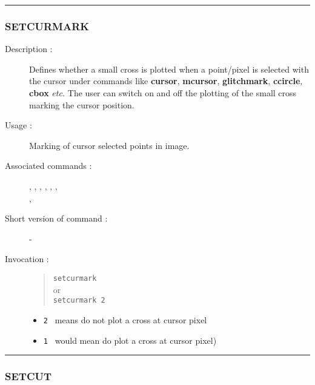 \hrule
\subsubsection*{\label{SETCURMARK}SETCURMARK}

\begin{description}

\item[Description :] Defines whether a small cross is plotted when a
point/pixel is selected with the cursor under commands like {\bf cursor},
{\bf mcursor}, {\bf glitchmark}, {\bf ccircle}, {\bf cbox} \emph{etc.}
The user can switch on and off the plotting of the small cross marking
the cursor position.

\item[Usage :] Marking of cursor selected points in image.

\item[Associated commands :] {\tt {}},
{\tt {}}, {\tt {}},
{\tt {}}, {\tt {}},
{\tt {}}, \\ {\tt {}},
{\tt {}}

\item[Short version of command :] -
\item[Invocation :]

\begin{quote}{\tt  setcurmark }\\
or \\
{\tt setcurmark 2 }
\end{quote}

\begin{itemize}

\item {\tt 2 } means do not plot a cross at cursor pixel
\item {\tt 1 } would mean do plot a cross at cursor pixel)
\end{itemize}

\end{description}

\hrule
\subsubsection*{\label{SETCUT}SETCUT}

